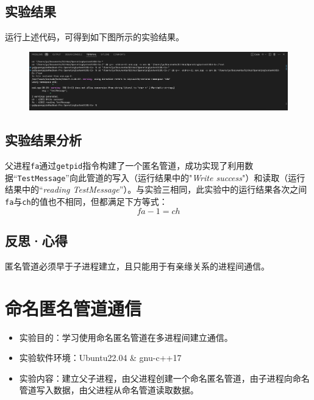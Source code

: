 \documentclass[UTF8]{ctexart}
\begin{document}
\subsection{实验结果}
运行上述代码，可得到如下图所示的实验结果。
\begin{figure}[htbp]
	\begin{center}
		\includegraphics[width=0.8\pdfpagewidth]{os4.png}
	\end{center}
\end{figure}
\subsection{实验结果分析}
父进程\texttt{fa}通过\texttt{getpid}指令构建了一个匿名管道，成功实现了利用数据“\texttt{TestMessage}”向此管道的写入（运行结果中的"\textit{Write success}"）和读取（运行结果中的“\textit{reading TestMessage}”）。与实验三相同，此实验中的运行结果各次之间\texttt{fa}与\texttt{ch}的值也不相同，但都满足下方等式：
\begin{equation}
	fa - 1 = ch
\end{equation}
\subsection{反思·心得}
匿名管道必须早于子进程建立，且只能用于有亲缘关系的进程间通信。
\clearpage
\section{命名匿名管道通信}
\begin{itemize}
	\item 实验目的：学习使用命名匿名管道在多进程间建立通信。
	\item 实验软件环境：Ubuntu22.04 \& gnu-c++17
	\item 实验内容：建立父子进程，由父进程创建一个命名匿名管道，由子进程向命名管道写入数据，由父进程从命名管道读取数据。
\end{itemize}
\end{document}
